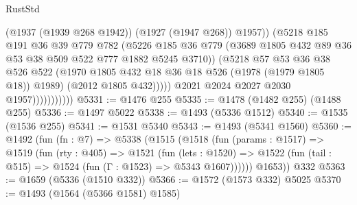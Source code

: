 \begin{lexlean}{RustStd}
\begin{coremodule}
                                  (@1937 (@1939 @268 @1942))
                                  (@1927 (@1947 @268))
                                  @1957))
                              (@5218
                                @185
                                @191
                                @36
                                @39
                                @779
                                @782
                                (@5226
                                  @185
                                  @36
                                  @779
                                  (@3689
                                    @1805
                                    @432
                                    @89
                                    @36
                                    @53
                                    @38
                                    @509
                                    @522
                                    @777
                                    @1882
                                    @5245
                                    @3710))
                                (@5218
                                  @57
                                  @53
                                  @36
                                  @38
                                  @526
                                  @522
                                  (@1970
                                    @1805
                                    @432
                                    @18
                                    @36
                                    @18
                                    @526
                                    (@1978 (@1979 @1805 @18))
                                    @1989)
                                  (@2012 @1805 @432)))))
                          @2021
                          @2024
                          @2027
                          @2030
                          @1957)))))))))))
@5331 := @1476 @255
@5335 := @1478 (@1482 @255) (@1488 @255)
@5336 := @1497 @5022
@5338 := @1493 (@5336 @1512)
@5340 := @1535 (@1536 @255)
@5341 := @1531 @5340
@5343 := @1493 (@5341 @1560)
@5360 := @1492
    (fun (fn : @7) =>
    @5338
      (@1515
        (@1518
          (fun (params : @1517) =>
          @1519
            (fun (rty : @405) =>
            @1521
              (fun (lets : @1520) =>
              @1522 (fun (tail : @515) => @1524 (fun (Γ : @1523) => @5343 @1607))))))
        @1653))
    @332
@5363 := @1659 (@5336 (@1510 @332))
@5366 := @1572 (@1573 @332) @5025
@5370 := @1493 (@1564 (@5366 @1581) @1585)

\end{coremodule}
\end{lexlean}

